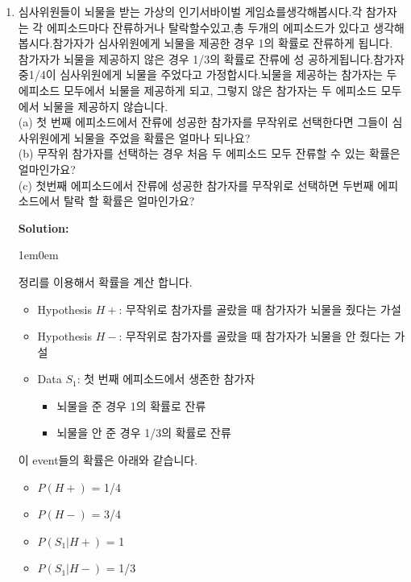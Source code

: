 \documentclass{article}
\newenvironment{solution}
{
    \par\medskip
    \noindent\textbf{Solution:}
    \begin{adjustwidth}{1em}{0em}
}
{
    \end{adjustwidth}
    \medskip
}
\begin{document}
\begin{enumerate}[label=\textbf{\arabic*.}, leftmargin=*]
\begin{solution}
\begin{enumerate}[label=(\alph*), leftmargin=2em, itemsep=1em]
        \end{enumerate}
    \end{solution}

\newpage

\item 심사위원들이 뇌물을 받는 가상의 인기서바이벌 게임쇼를생각해봅시다.각 참가자는 각 에피소드마다
잔류하거나 탈락할수있고,총 두개의 에피소드가 있다고 생각해봅시다.참가자가 심사위원에게 뇌물을
제공한 경우 1의 확률로 잔류하게 됩니다. 참가자가 뇌물을 제공하지 않은 경우 1/3의 확률로 잔류에 성
공하게됩니다.참가자중1/4이 심사위원에게 뇌물을 주었다고 가정합시다.뇌물을 제공하는 참가자는 두
에피소드 모두에서 뇌물을 제공하게 되고, 그렇지 않은 참가자는 두 에피소드 모두에서 뇌물을 제공하지
않습니다.\\
(a) 첫 번째 에피소드에서 잔류에 성공한 참가자를 무작위로 선택한다면 그들이 심사위원에게 뇌물을 주었을 확률은 얼마나 되나요?\\
(b) 무작위 참가자를 선택하는 경우 처음 두 에피소드 모두 잔류할 수 있는 확률은 얼마인가요?\\
(c) 첫번째 에피소드에서 잔류에 성공한 참가자를 무작위로 선택하면 두번째 에피소드에서 탈락 할 확률은 
얼마인가요?

    \begin{solution}
        \begin{enumerate}[label=(\alph*), leftmargin=2em, itemsep=1em]
        
         정리를 이용해서 확률을 계산 합니다.
            \begin{itemize}[itemsep=0em]
                \item Hypothesis $H+$:  무작위로 참가자를 골랐을 때 참가자가 뇌물을 줬다는 가설
                \item Hypothesis $H-$:  무작위로 참가자를 골랐을 때 참가자가 뇌물을 안 줬다는 가설
                \item Data $S_1$: 첫 번째 에피소드에서 생존한 참가자
                    \begin{itemize}
                	  \item 뇌물을 준 경우 1의 확률로 잔류
                	  \item 뇌물을 안 준 경우 1/3의 확률로 잔류
                    \end{itemize}
            \end{itemize}
            
        이 event들의 확률은 아래와 같습니다.
        \begin{itemize}[itemsep=0em]
            \item  $P(H+)$ = 1/4
            \item $P(H-)$ = 3/4
            \item $P(S_1 | H+)$ = 1
            \item $P(S_1 | H-)$ = 1/3
        \end{itemize}
        

\end{enumerate}
\end{solution}
\end{enumerate}
\end{document}
